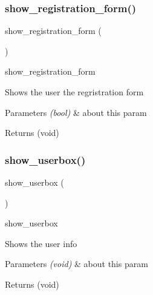 \subsubsection{\texorpdfstring{show\+\_\+registration\+\_\+form()}{show\_registration\_form()}}
{\footnotesize\ttfamily show\+\_\+registration\+\_\+form (\begin{DoxyParamCaption}{ }\end{DoxyParamCaption})}

show\+\_\+registration\+\_\+form

Shows the user the regristration form


\begin{DoxyParams}{Parameters}
{\em (bool)} & about this param \\
\hline
\end{DoxyParams}
\begin{DoxyReturn}{Returns}
(void) 
\end{DoxyReturn}
\mbox{\label{display_8functions_8inc_8php_a6ea4a1c3ccfe6b79dc5adc6e11ad2bf4}} 
\subsubsection{\texorpdfstring{show\+\_\+userbox()}{show\_userbox()}}
{\footnotesize\ttfamily show\+\_\+userbox (\begin{DoxyParamCaption}{ }\end{DoxyParamCaption})}

show\+\_\+userbox

Shows the user info


\begin{DoxyParams}{Parameters}
{\em (void)} & about this param \\
\hline
\end{DoxyParams}
\begin{DoxyReturn}{Returns}
(void) 
\end{DoxyReturn}
